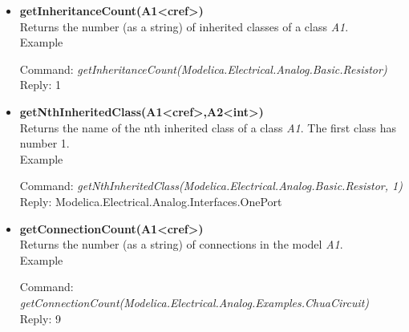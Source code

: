 \documentclass[11pt,a4paper,oneside,english]{book}
\newenvironment{modelicaExamples}{\begin{itemize}}{\end{itemize}}
\newcommand{\api}[2]{\item \textbf{#1} \\ #2}
\newcommand{\command}[1]{Command: \textit{#1}\\}
\newcommand{\reply}[1]{Reply: #1}
\newcommand{\functionex}[2]{\begin{singlespace} \command{#1} \reply{#2} \end{singlespace}}
\newcommand{\examples}{Example}
\newenvironment{mocode}{\begin{verse}\begin{singlespace}\begin{scriptsize}\ttfamily}{\end{scriptsize}\end{singlespace}\end{verse}}
\begin{document}
\begin{modelicaExamples}
			\functionex{getNthComponentModification(test.mymodel, 1)}
			{\{Code((start=2, min=10)=Resistor(R=2))\}}
			
			\functionex{getComponentModifierValue(test.mymodel, r1)}
			{Resistor(R=2)}
			
			\functionex{getComponentModifierValue(test.mymodel, r1.start)}
			{=2}
			
			\functionex{getComponentModifierValue(test.mymodel, r1.min)}
			{=10}
			
			\functionex{setComponentModifierValue(test.mymodel, r1.min, Code(()))}
			{Ok}
			
			\begin{mocode}
			\dots \\
			Modelica.Electrical.Analog.Basic.Resistor r1(start=2)=Resistor(R=2);\\
			\dots \\
			\end{mocode}
			\functionex{setComponentModifierValue(test.mymodel, r1, Code(()))}
			{Ok}
			
			\begin{mocode}
			\dots \\
			Modelica.Electrical.Analog.Basic.Resistor r1(start=2);\\
			\dots \\
			\end{mocode}
			\functionex{setComponentModifierValue(test.mymodel, r1.start, Code(()))}
			{Ok}
			
			\begin{mocode}
			\dots \\
			Modelica.Electrical.Analog.Basic.Resistor r1;\\
			\dots \\
			\end{mocode}
			
		\api{getInheritanceCount(A1<cref>)}{Returns the number (as a string) of inherited classes of a class \textit{A1}.\\
		\examples
		\functionex{getInheritanceCount(Modelica.Electrical.Analog.Basic.Resistor)}
		{1}
		}
		
		\api{getNthInheritedClass(A1<cref>,A2<int>)}{Returns the name of the nth inherited class of a class \textit{A1}. The first class has number 1.\\
		\examples
		\functionex{getNthInheritedClass(Modelica.Electrical.Analog.Basic.Resistor, 1)}
		{Modelica.Electrical.Analog.Interfaces.OnePort}
		}
		
		\api{getConnectionCount(A1<cref>)}{Returns the number (as a string) of connections in the model \textit{A1}.\\
		\examples
		\functionex{getConnectionCount(Modelica.Electrical.Analog.Examples.Chua\-Circuit)}
		{9}
		}
		

\end{modelicaExamples}
\end{document}
